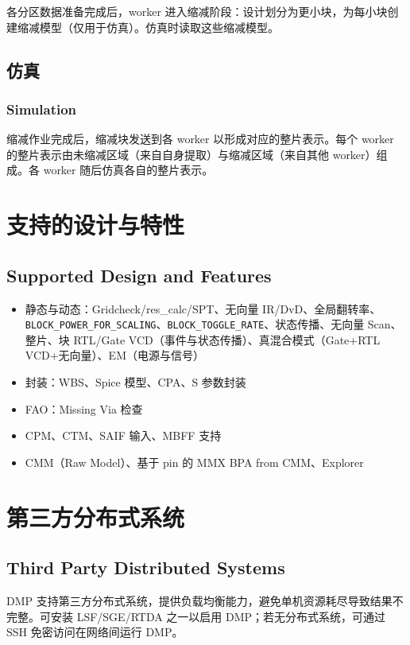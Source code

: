 各分区数据准备完成后，worker 进入缩减阶段：设计划分为更小块，为每小块创建缩减模型（仅用于仿真）。仿真时读取这些缩减模型。


\subsection{仿真}
\subsubsection*{Simulation}

缩减作业完成后，缩减块发送到各 worker 以形成对应的整片表示。每个 worker 的整片表示由未缩减区域（来自自身提取）与缩减区域（来自其他 worker）组成。各 worker 随后仿真各自的整片表示。

\section{支持的设计与特性}
\subsection*{Supported Design and Features}

\begin{itemize}
  \item 静态与动态：Gridcheck/res\_calc/SPT、无向量 IR/DvD、全局翻转率、\texttt{BLOCK\_POWER\_FOR\_SCALING}、\texttt{BLOCK\_TOGGLE\_RATE}、状态传播、无向量 Scan、整片、块 RTL/Gate VCD（事件与状态传播）、真混合模式（Gate+RTL VCD+无向量）、EM（电源与信号）
  \item 封装：WBS、Spice 模型、CPA、S 参数封装
  \item FAO：Missing Via 检查
  \item CPM、CTM、SAIF 输入、MBFF 支持
  \item CMM（Raw Model）、基于 pin 的 MMX BPA from CMM、Explorer
\end{itemize}

\section{第三方分布式系统}
\subsection*{Third Party Distributed Systems}

DMP 支持第三方分布式系统，提供负载均衡能力，避免单机资源耗尽导致结果不完整。可安装 LSF/SGE/RTDA 之一以启用 DMP；若无分布式系统，可通过 SSH 免密访问在网络间运行 DMP。

